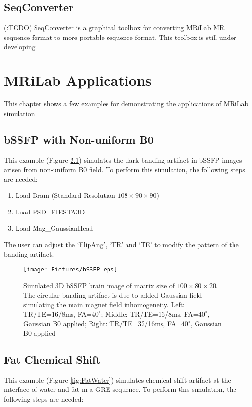 \documentclass{book}%
\begin{document}
\section{SeqConverter}
(:TODO) SeqConverter is a graphical toolbox for converting MRiLab MR sequence format to more portable sequence format. This toolbox is still under developing.

\chapter{MRiLab Applications}

This chapter shows a few examples for demonstrating the applications of MRiLab simulation

\section{bSSFP with Non-uniform B0}

This example (Figure \ref{fig:bSSFP}) simulates the dark banding artifact in bSSFP images arisen from non-uniform B0 field. To perform this simulation, the following steps are needed:

\begin{enumerate}
	\item Load Brain (Standard Resolution $108 \times 90 \times 90$)
  \item Load PSD\_FIESTA3D
	\item Load Mag\_GaussianHead
\end{enumerate}

The user can adjust the `FlipAng', `TR' and `TE' to modify the pattern of the banding artifact. 

\begin{figure}[htbp]
	\centering
		\texttt{[image: Pictures/bSSFP.eps]}
	\caption{Simulated 3D bSSFP brain image of matrix size of $100 \times 80 \times 20$. The circular banding artifact is due to added Gaussian field simulating the main magnet field inhomogeneity. Left: TR/TE=16/8ms, FA=$40^{\circ}$; Middle: TR/TE=16/8ms, FA=$40^{\circ}$, Gaussian B0 applied; Right: TR/TE=32/16ms, FA=$40^{\circ}$, Gaussian B0 applied}
	\label{fig:bSSFP}
\end{figure}


\section{Fat Chemical Shift}

This example (Figure \ref{fig:FatWater}) simulates chemical shift artifact at the interface of water and fat in a GRE sequence. To perform this simulation, the following steps are needed:
\end{document}
